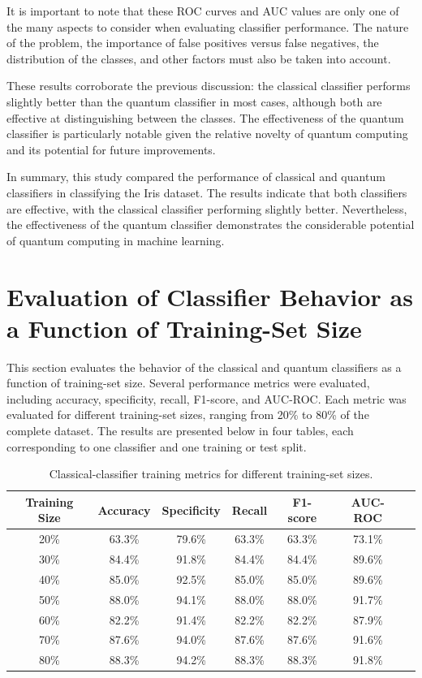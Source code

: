 It is important to note that these ROC curves and AUC values are only one of the many aspects to consider when evaluating classifier performance. The nature of the problem, the importance of false positives versus false negatives, the distribution of the classes, and other factors must also be taken into account.

These results corroborate the previous discussion: the classical classifier performs slightly better than the quantum classifier in most cases, although both are effective at distinguishing between the classes. The effectiveness of the quantum classifier is particularly notable given the relative novelty of quantum computing and its potential for future improvements.


In summary, this study compared the performance of classical and quantum classifiers in classifying the Iris dataset. The results indicate that both classifiers are effective, with the classical classifier performing slightly better. Nevertheless, the effectiveness of the quantum classifier demonstrates the considerable potential of quantum computing in machine learning.

\section{Evaluation of Classifier Behavior as a Function of Training-Set Size}

This section evaluates the behavior of the classical and quantum classifiers as a function of training-set size. Several performance metrics were evaluated, including accuracy, specificity, recall, F1-score, and AUC-ROC. Each metric was evaluated for different training-set sizes, ranging from 20\% to 80\% of the complete dataset. The results are presented below in four tables, each corresponding to one classifier and one training or test split.

\begin{table}[H]
\centering
\caption{Classical-classifier training metrics for different training-set sizes.}
\small
\begin{tabular}{|c|c|c|c|c|c|c|}
\hline
\textbf{Training Size} & \textbf{Accuracy} & \textbf{Specificity} & \textbf{Recall} & \textbf{F1-score} & \textbf{AUC-ROC} \\ \hline
20\% & 63.3\% & 79.6\% & 63.3\% & 63.3\% & 73.1\% \\ \hline
30\% & 84.4\% & 91.8\% & 84.4\% & 84.4\% & 89.6\% \\ \hline
40\% & 85.0\% & 92.5\% & 85.0\% & 85.0\% & 89.6\% \\ \hline
50\% & 88.0\% & 94.1\% & 88.0\% & 88.0\% & 91.7\% \\ \hline
60\% & 82.2\% & 91.4\% & 82.2\% & 82.2\% & 87.9\% \\ \hline
70\% & 87.6\% & 94.0\% & 87.6\% & 87.6\% & 91.6\% \\ \hline
80\% & 88.3\% & 94.2\% & 88.3\% & 88.3\% & 91.8\% \\ \hline
\end{tabular}
\end{table}

